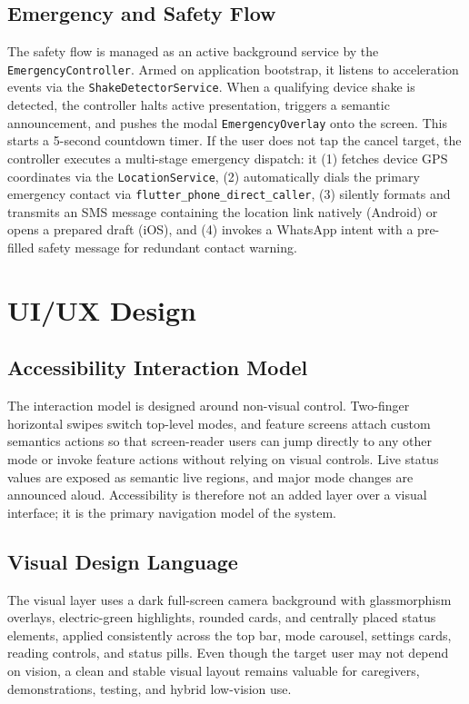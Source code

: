 \documentclass[12pt,a4paper]{report}
\begin{document}
\subsection{Emergency and Safety Flow}
The safety flow is managed as an active background service by the \texttt{EmergencyController}. Armed on application bootstrap, it listens to acceleration events via the \texttt{ShakeDetectorService}. When a qualifying device shake is detected, the controller halts active presentation, triggers a semantic announcement, and pushes the modal \texttt{EmergencyOverlay} onto the screen. This starts a 5-second countdown timer. If the user does not tap the cancel target, the controller executes a multi-stage emergency dispatch: it (1) fetches device GPS coordinates via the \texttt{LocationService}, (2) automatically dials the primary emergency contact via \texttt{flutter\_phone\_direct\_caller}, (3) silently formats and transmits an SMS message containing the location link natively (Android) or opens a prepared draft (iOS), and (4) invokes a WhatsApp intent with a pre-filled safety message for redundant contact warning.

\section{UI/UX Design}
\subsection{Accessibility Interaction Model}
The interaction model is designed around non-visual control. Two-finger horizontal swipes switch top-level modes, and feature screens attach custom semantics actions so that screen-reader users can jump directly to any other mode or invoke feature actions without relying on visual controls. Live status values are exposed as semantic live regions, and major mode changes are announced aloud. Accessibility is therefore not an added layer over a visual interface; it is the primary navigation model of the system.

\subsection{Visual Design Language}
The visual layer uses a dark full-screen camera background with glassmorphism overlays, electric-green highlights, rounded cards, and centrally placed status elements, applied consistently across the top bar, mode carousel, settings cards, reading controls, and status pills. Even though the target user may not depend on vision, a clean and stable visual layout remains valuable for caregivers, demonstrations, testing, and hybrid low-vision use.
\end{document}
